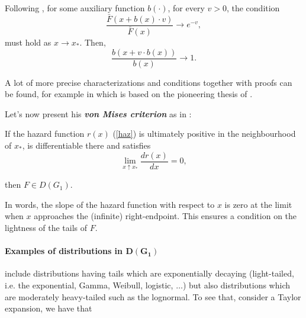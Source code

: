 \begin{theorem} Following \cite[pp.72]{beirlant_statistics_2006},
	for some auxiliary function $b(\cdot )$, for every $v>0$, the condition
	\begin{equation}
	\frac{\bar{F}(x+b(x)\cdot v)}{\bar{F}(x)} \to e^{-v},
	\end{equation}
	must hold as $x\to x_*$. Then, 
	\begin{equation*}
	\frac{b(x+v\cdot b(x))}{b(x)}\to 1 .
	\end{equation*} 
\end{theorem}

A lot of more precise characterizations and conditions together with proofs can be found, for example in \citet[pp.20-33]{haan_extreme_2006} which is based on the pioneering thesis of \citet{haan_regular_1970-1}. 

Let's now present his \emph{\textbf{von Mises criterion}} as in \cite[pp.73]{beirlant_statistics_2006}: 

\begin{theorem} If the hazard function $r(x)$ (\ref{haz})
is ultimately positive in the neighbourhood of $x_*$, is differentiable there and satisfies 
\begin{equation}
\displaystyle{\lim_{x  \uparrow  x_*}} \frac{dr(x)}{dx}=0,
\end{equation}
\end{theorem}

then $F\in D(G_1)$. 

In words, the slope of the hazard function with respect to $x$ is zero at the limit when $x$ approaches the (infinite) right-endpoint. This ensures a condition on the lightness of the tails of $F$.

\paragraph*{Examples of distributions in $\boldsymbol{D(G_1)}$} include distributions having tails which are exponentially decaying (light-tailed, i.e. the exponential, Gamma, Weibull, logistic, $\dots$) but also distributions which are moderately heavy-tailed such as the lognormal.
To see that, consider a Taylor expansion, we have that 

